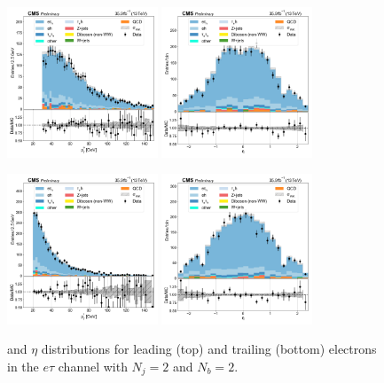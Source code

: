 \begin{figure}[htb!]
    \centering
    \includegraphics[width=0.4\textwidth]{chapters/Analysis/sectionPlots/figures/data_mc_overlays/etau_2016_cat_eq2_eq2_signal_linear_lepton_lepton1_pt}
    \includegraphics[width=0.4\textwidth]{chapters/Analysis/sectionPlots/figures/data_mc_overlays/etau_2016_cat_eq2_eq2_signal_linear_lepton_lepton1_eta}

    \includegraphics[width=0.4\textwidth]{chapters/Analysis/sectionPlots/figures/data_mc_overlays/etau_2016_cat_eq2_eq2_signal_linear_lepton_lepton2_pt}
    \includegraphics[width=0.4\textwidth]{chapters/Analysis/sectionPlots/figures/data_mc_overlays/etau_2016_cat_eq2_eq2_signal_linear_lepton_lepton2_eta}
    \caption{\pt and $\eta$ distributions for leading (top) and trailing
        (bottom) electrons in the $e\tau$ channel with $N_{j} = 2$ and
        $N_{b} = 2$.}
    \label{fig:analysis:plots:etau_6_kinematic}
\end{figure}

